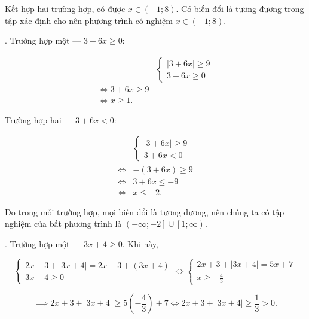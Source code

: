 Kết hợp hai trường hợp, có được $x \in \left(-1; 8\right)$. Có biến đổi là tương đương trong tập xác định cho nên phương trình có nghiệm $x \in \left(-1; 8\right)$.

. \textcolor{colorEmphasisCyan}{Trường hợp một --- $3 + 6x \geq 0$}:

\begin{align*}
   &\begin{cases}
      |3 + 6x| \geq 9 \\
      3 + 6x \geq 0
   \end{cases} \\
   \iff 3 + 6x \geq 9 \\
   \iff x \geq 1.
\end{align*}

\textcolor{colorEmphasis}{Trường hợp hai --- $3 + 6x < 0$}:

\begin{align*}
   &\begin{cases}
      |3 + 6x| \geq 9 \\
      3 + 6x < 0
   \end{cases} \\
   \iff &-(3 + 6x) \geq 9 \\
   \iff &3 + 6x \leq -9 \\
   \iff &x \leq -2.
\end{align*}

Do trong mỗi trường hợp, mọi biến đổi là tương đương, nên chúng ta có tập nghiệm của bất phương trình là $\left(-\infty; -2\right] \cup \left[1; \infty\right)$.

. \textcolor{colorEmphasisCyan}{Trường hợp một --- $3x + 4 \geq 0$}. Khi này, 

\begin{equation*}
   \begin{cases}
      2x + 3 + |3x + 4| = 2x + 3 + (3x + 4) \\
      3x + 4 \geq 0
   \end{cases} \iff \begin{cases}
      2x + 3 + |3x + 4| = 5x + 7 \\
      x \geq -\frac{4}{3}
   \end{cases}
\end{equation*}

\begin{equation*}
   \implies 2x + 3 + |3x + 4| \geq 5 \left(-\frac{4}{3}\right) + 7 \iff 2x + 3 + |3x + 4| \geq \frac{1}{3} > 0.
\end{equation*}

